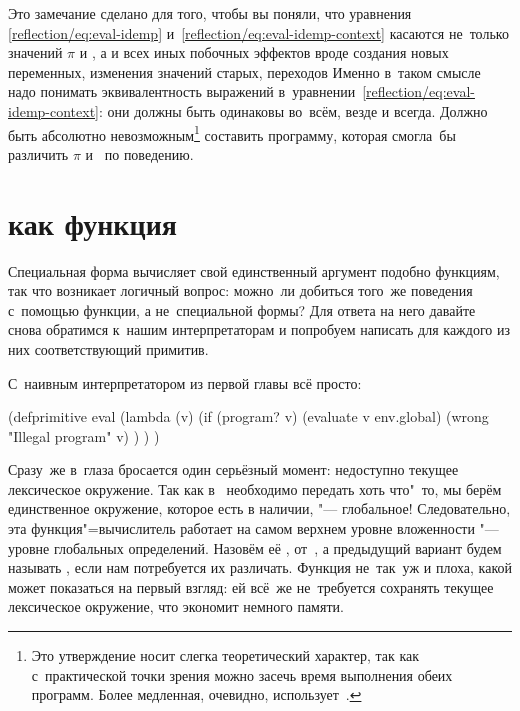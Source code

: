 Это замечание сделано для того, чтобы вы поняли, что уравнения
\eqref{reflection/eq:eval-idemp} и~\eqref{reflection/eq:eval-idemp-context}
касаются не~только значений $\pi$ и , а и всех иных побочных
эффектов вроде создания новых переменных, изменения значений старых, переходов
{\itd} Именно в~таком смысле надо понимать эквивалентность выражений
в~уравнении~\eqref{reflection/eq:eval-idemp-context}: они должны быть одинаковы
во~всём, везде и всегда. Должно быть абсолютно невозможным\footnote{Это
утверждение носит слегка теоретический характер, так как с~практической точки
зрения можно засечь время выполнения обеих программ. Более медленная, очевидно,
использует~.} составить программу, которая смогла~бы различить $\pi$
и~ по поведению.


\section{\texorpdfstring{\protect{} как функция}{eval как функция}}%
\label{reflection/sect:eval-as-func}

Специальная форма  вычисляет свой единственный аргумент подобно
функциям, так что возникает логичный вопрос: можно~ли добиться того~же поведения
с~помощью функции, а не~специальной формы? Для ответа на него давайте снова
обратимся к~нашим интерпретаторам и попробуем написать для каждого из них
соответствующий примитив.

С~наивным интерпретатором из первой главы 
всё просто:

\begin{code:lisp}
(defprimitive eval
  (lambda (v)
    (if (program? v)
        (evaluate v env.global)
        (wrong "Illegal program" v) ) ) )
\end{code:lisp}

Сразу~же в~глаза бросается один серьёзный момент:  недоступно текущее
лексическое окружение. Так как в~ необходимо передать хоть что"~то,
мы берём единственное окружение, которое есть в наличии, "--- глобальное! Следовательно, эта
функция"=вычислитель работает на самом верхнем уровне вложенности "--- уровне
глобальных определений. Назовём её , от~,
а предыдущий вариант будем называть , если нам потребуется их
различать. Функция  не~так~уж и плоха, какой может показаться на
первый взгляд: ей всё~же не~требуется сохранять текущее лексическое окружение,
что экономит немного памяти.

